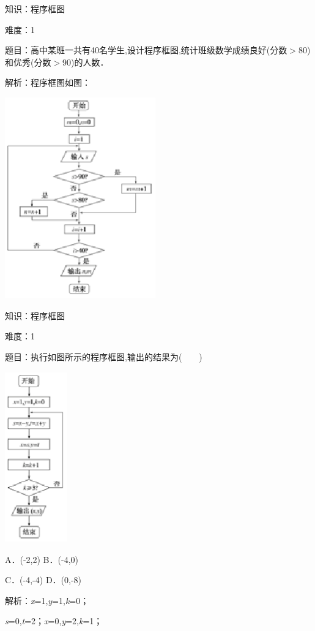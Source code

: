 \documentclass{article} %
\begin{document}
知识：程序框图

难度：1

题目：高中某班一共有40名学生,设计程序框图,统计班级数学成绩良好(分数$\mathrm{>}$80)和优秀(分数$\mathrm{>}$90)的人数．

解析：程序框图如图：


{\bf \includegraphics*[width=2.56in, height=3.42in, keepaspectratio=false]{image23}}



知识：程序框图

难度：1

题目：执行如图所示的程序框图,输出的结果为(　　)

\includegraphics*[width=1.06in, height=2.90in, keepaspectratio=false]{image24}

A．(-2,2)      B．(-4,0)

C．(-4,-4)  D．(0,-8)

解析：\textit{x}=1,\textit{y}=1,\textit{k}=0；

\textit{s}=0,\textit{t}=2；\textit{x}=0,\textit{y}=2,\textit{k}=1；
\end{document}
